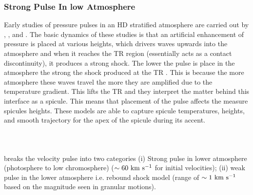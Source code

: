 \documentclass[12pt]{ociamthesis}
\newcommand{\kms}{~\rm{km ~s^{-1}}}
\newcommand{\np}{\\ \\}
\begin{document}
\subsubsection{Strong Pulse In low Atmosphere}
\label{sssec:pulse_model}
 Early studies of pressure pulses in an HD stratified atmosphere are carried out by \cite{Suematsu1982SoPh7599S}, \cite{Shibata1982, Shibata1982SoPh78333S}, and \citep{Hollweg1982ApJ257345H}. The basic dynamics of these studies is that an artificial enhancement of pressure is placed at various heights, which drivers waves upwards into the atmosphere and when it reaches the TR region (essentially acts as a contact discontinuity), it produces a strong shock. The lower the pulse is place in the atmosphere the strong the shock produced at the TR \citep{Shibata1982, Shibata1982SoPh78333S}. This is because the more atmosphere these waves travel the more they are amplified due to the temperature gradient. This lifts the TR and they interpret the matter behind this interface as a spicule. This means that placement of the pulse affects the measure spicules heights. These models are able to capture spicule temperatures, heights, and smooth trajectory for the apex of the spicule during its accent. \np \np     
\cite{Sterling_2000SoPh} breaks the velocity pulse into two categories (i) Strong pulse in lower atmosphere (photosphere to low chromosphere) ($\sim 60\kms$ for initial velocities); (ii) weak pulse in the lower atmosphere i.e. rebound shock model (range of $\sim 1 \kms$ based on the magnitude seen in granular motions). 
\end{document}
